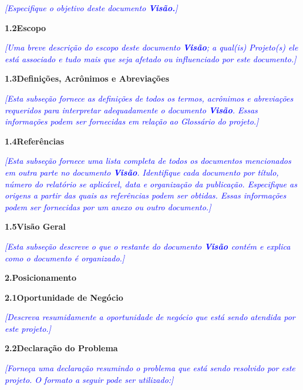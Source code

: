 \documentclass[a4paper]{article}
\begin{document}
\textit{\textcolor{blue}{[Especifique o objetivo deste documento
}}\textbf{\textit{\textcolor{blue}{Vis\~ao.}}}\textit{\textcolor{blue}{]}}

\hypertarget{tvu2oa77sfsk}{}\textbf{1.2Escopo}

\textit{\textcolor{blue}{[Uma breve descri\c{c}\~ao do escopo deste documento
}}\textbf{\textit{\textcolor{blue}{Vis\~ao}}}\textit{\textcolor{blue}{; a qual(is) Projeto(s) ele est\'a associado e
tudo mais que seja afetado ou influenciado por este documento.]}}

\hypertarget{32ir7uiczi8s}{}\textbf{1.3Defini\c{c}\~oes, Acr\^onimos e Abrevia\c{c}\~oes}

\textit{\textcolor{blue}{[Esta subse\c{c}\~ao fornece as defini\c{c}\~oes de todos os termos, acr\^onimos e
abrevia\c{c}\~oes requeridos para interpretar adequadamente o documento
}}\textbf{\textit{\textcolor{blue}{Vis\~ao}}}\textit{\textcolor{blue}{. Essas informa\c{c}\~oes podem ser fornecidas em
rela\c{c}\~ao ao Gloss\'ario do projeto.]}}

\hypertarget{jdov52ki4krl}{}\textbf{1.4Refer\^encias}

\textit{\textcolor{blue}{[Esta subse\c{c}\~ao fornece uma lista completa de todos os documentos mencionados em outra
parte no documento }}\textbf{\textit{\textcolor{blue}{Vis\~ao}}}\textit{\textcolor{blue}{. Identifique cada documento
por t\'itulo, n\'umero do relat\'orio se aplic\'avel, data e organiza\c{c}\~ao da publica\c{c}\~ao. Especifique as
origens a partir das quais as refer\^encias podem ser obtidas. Essas informa\c{c}\~oes podem ser fornecidas por um
anexo ou outro documento.]}}

\hypertarget{vhgkzpq1352v}{}\textbf{1.5Vis\~ao Geral}

\textit{\textcolor{blue}{[Esta subse\c{c}\~ao descreve o que o restante do documento
}}\textbf{\textit{\textcolor{blue}{Vis\~ao }}}\textit{\textcolor{blue}{cont\'em e explica como o documento \'e
organizado.]}}

\hypertarget{h594f1srb451}{}\textbf{2.Posicionamento}

\hypertarget{ullot36our2x}{}\textbf{2.1Oportunidade de Neg\'ocio}

\textit{\textcolor{blue}{[Descreva resumidamente a oportunidade de neg\'ocio que est\'a sendo atendida por este
projeto.]}}

\hypertarget{ms4flj8sfg29}{}\textbf{2.2Declara\c{c}\~ao do Problema}

\textit{\textcolor{blue}{[Forne\c{c}a uma declara\c{c}\~ao resumindo o problema que est\'a sendo resolvido por este
projeto. O formato a seguir pode ser utilizado:]}}
\end{document}
